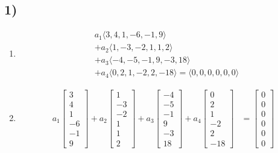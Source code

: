 \documentclass{article}
\begin{document}
\subsection{1)}
\begin{enumerate}[label = \textbf{\alph*)}]
	\item
		\begin{align*}
			& a_1 \langle 3, 4, 1, -6, -1, 9 \rangle \\
			& + a_2 \langle 1, -3, -2, 1, 1, 2 \rangle \\
			& + a_3 \langle -4, -5, -1, 9, -3, 18 \rangle \\
			& + a_4 \langle 0, 2, 1, -2, 2, -18 \rangle = \langle 0, 0, 0, 0, 0, 0 \rangle
		\end{align*}
	\item
		\begin{align*}
			a_1 \begin{bmatrix} 3 \\ 4 \\ 1 \\ -6 \\ -1 \\ 9 \end{bmatrix}
			+ a_2 \begin{bmatrix} 1 \\ -3 \\ -2 \\ 1 \\ 1 \\ 2 \end{bmatrix}
			+ a_3 \begin{bmatrix} -4 \\ -5 \\ -1 \\ 9 \\ -3 \\ 18 \end{bmatrix}
			+ a_4 \begin{bmatrix} 0 \\ 2 \\ 1 \\ -2 \\ 2 \\ -18 \end{bmatrix}
			& = \begin{bmatrix} 0 \\ 0 \\ 0 \\ 0 \\ 0 \\ 0 \end{bmatrix}

\end{align*}
\end{enumerate}
\end{document}
